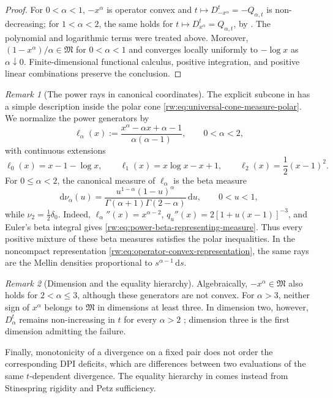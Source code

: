 \documentclass[11pt]{article}
\theoremstyle{remark}
\newtheorem{remark}[remark]{Remark}
\newcommand{\1}{\mathbbm{1}}
\begin{document}
\begin{proof}
For $0<\alpha<1$, $-x^\alpha$ is operator convex and
$t\mapsto D_{-x^\alpha}^t=-Q_{\alpha,t}$ is non-decreasing; for
$1<\alpha<2$, the same holds for
$t\mapsto D_{x^\alpha}^t=Q_{\alpha,t}$, by
.
The polynomial and logarithmic terms were treated above.  Moreover,
$(1-x^\alpha)/\alpha\in\mathfrak M$ for $0<\alpha<1$ and
converges locally uniformly to $-\log x$ as $\alpha\downarrow0$.
Finite-dimensional functional calculus, positive integration, and
positive linear combinations preserve the conclusion.
\end{proof}

\begin{remark}[The power rays in canonical coordinates]
The explicit subcone in
 has a simple description inside
the polar cone
\eqref{rw:eq:universal-cone-measure-polar}.  We normalize the power
generators by
\begin{equation}
 \ell_\alpha(x)
 :=\frac{x^\alpha-\alpha x+\alpha-1}{\alpha(\alpha-1)},
 \qquad 0<\alpha<2,
 \label{rw:eq:normalized-power-generators}
\end{equation}
with continuous extensions
\begin{equation*}
 \ell_0(x)=x-1-\log x,
 \qquad
 \ell_1(x)=x\log x-x+1,
 \qquad
 \ell_2(x)=\frac12(x-1)^2.
\end{equation*}
For \(0\leq\alpha<2\), the canonical measure of
\(\ell_\alpha\) is the beta measure
\begin{equation}
 \mathrm d\nu_\alpha(u)
 =\frac{u^{1-\alpha}(1-u)^\alpha}
 {\Gamma(\alpha+1)\Gamma(2-\alpha)}\,\mathrm du,
 \qquad 0<u<1,
 \label{rw:eq:power-beta-representing-measure}
\end{equation}
while \(\nu_2=\frac12\delta_0\).  Indeed,
\(\ell_\alpha''(x)=x^{\alpha-2}\),
\(q_u''(x)=2[1+u(x-1)]^{-3}\), and Euler's beta integral gives
\eqref{rw:eq:power-beta-representing-measure}.  Thus every positive
mixture of these beta measures satisfies the polar inequalities.  In
the noncompact representation
\eqref{rw:eq:operator-convex-representation}, the same rays are the
Mellin densities proportional to \(s^{\alpha-1}\,\mathrm ds\).
\end{remark}

\begin{remark}[Dimension and the equality hierarchy]
Algebraically, $-x^\alpha\in\mathfrak M$ also holds for
$2<\alpha\leq3$, although these generators are not convex.  For
$\alpha>3$, neither sign of $x^\alpha$ belongs to $\mathfrak M$
in dimensions at least three.  In dimension two, however,
$D_\alpha^t$ remains non-increasing in $t$ for every $\alpha>2$
\cite[Theorem~4.4]{vuong2026hyperbolic}; dimension three is the first
dimension admitting the failure.

Finally, monotonicity of a divergence on a fixed pair does not order
the corresponding DPI deficits, which are differences between two
evaluations of the same $t$-dependent divergence.  The equality
hierarchy in
 comes instead
from Stinespring
rigidity and Petz sufficiency.
\end{remark}
\end{document}
